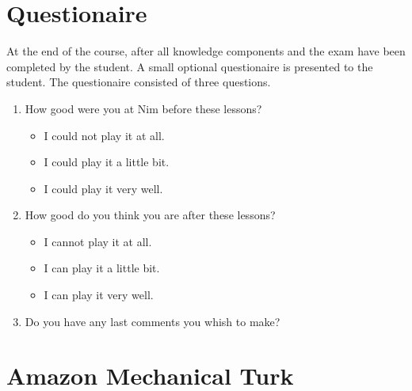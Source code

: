 \section{Questionaire}
At the end of the course, after all knowledge components and the exam have been
completed by the student. A small optional questionaire is presented to the
student. The questionaire consisted of three questions.
\begin{enumerate}
	\item How good were you at Nim before these lessons?
		\begin{itemize}
			\item I could not play it at all.
			\item I could play it a little bit.
			\item I could play it very well.
		\end{itemize}
	\item How good do you think you are after these lessons?
		\begin{itemize}
			\item I cannot play it at all.
			\item I can play it a little bit.
			\item I can play it very well.
		\end{itemize}
	\item Do you have any last comments you whish to make?
\end{enumerate}
\section{Amazon Mechanical Turk}
